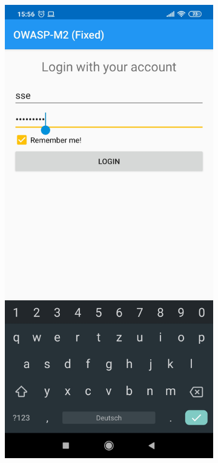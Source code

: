 \begin{figure}[htb!]
	\centering
	\begin{subfigure}{.3\textwidth}
  		\centering
  		\includegraphics[width=\linewidth]{imgs/secure_mobile_programming/app0_login_form_filled.jpg}

\end{subfigure}
\end{figure}

